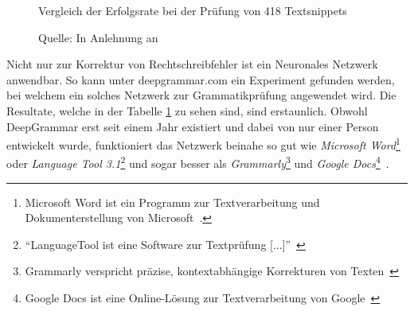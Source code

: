 \begin{figure} %
    \centering
    \caption{Vergleich der Erfolgsrate bei der Prüfung von 418 Textsnippets}
    \label{deepgrammar}
    \caption*{Quelle: In Anlehnung an \textcite{Mugan}}
\end{figure} %
Nicht nur zur Korrektur von Rechtschreibfehler ist ein Neuronales Netzwerk anwendbar. So kann unter deepgrammar.com ein Experiment gefunden werden, bei welchem ein solches Netzwerk zur Grammatikprüfung angewendet wird. Die Resultate, welche in der Tabelle \ref{deepgrammar} zu sehen sind, sind erstaunlich. Obwohl DeepGrammar erst seit einem Jahr existiert und dabei von nur einer Person entwickelt wurde, funktioniert das Netzwerk beinahe so gut wie \textit{Microsoft Word}\footnote{Microsoft Word ist ein Programm zur Textverarbeitung und Dokumenterstellung von Microsoft~\autocite{MicrosoftCorporation2018}.} oder \textit{Language Tool 3.1}\footnote{\enquote{LanguageTool ist eine Software zur Textprüfung [...]}~\autocite{LanguageTool2018}} und sogar besser als \textit{Grammarly}\footnote{Grammarly verspricht präzise, kontextabhängige Korrekturen von Texten~\autocite{GramarlyInc.2018}} und \textit{Google Docs}\footnote{Google Docs ist eine Online-Lösung zur Textverarbeitung von Google~\autocite{GoogleLLC2018}}~\autocite{Mugan}.


